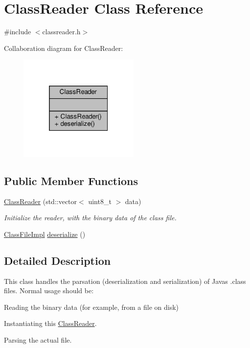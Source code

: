 \hypertarget{classClassReader}{}\section{Class\+Reader Class Reference}
\label{classClassReader}


{\ttfamily \#include $<$classreader.\+h$>$}



Collaboration diagram for Class\+Reader\+:\nopagebreak
\begin{figure}[H]
\begin{center}
\leavevmode
\includegraphics[width=169pt]{classClassReader__coll__graph}
\end{center}
\end{figure}
\subsection*{Public Member Functions}
\begin{DoxyCompactItemize}
\item 
\mbox{\label{classClassReader_a3470778a3f6fe462416950a69c305ff0}} 
\hyperlink{classClassReader_a3470778a3f6fe462416950a69c305ff0}{Class\+Reader} (std\+::vector$<$ uint8\+\_\+t $>$ data)
\begin{DoxyCompactList}\small\item\em Initialize the reader, with the binary {\ttfamily data} of the class file. \end{DoxyCompactList}\item 
\hyperlink{classClassFileImpl}{Class\+File\+Impl} \hyperlink{classClassReader_a001cc48324c31430559b43976d731e8a}{deserialize} ()
\end{DoxyCompactItemize}


\subsection{Detailed Description}
This class handles the parsation (deserialization and serialization) of Java\textquotesingle{}s .class files. Normal usage should be\+:
\begin{DoxyEnumerate}
\item Reading the binary data (for example, from a file on disk)
\item Instantiating this \hyperlink{classClassReader}{Class\+Reader}.
\item Parsing the actual file. 
\end{DoxyEnumerate}

